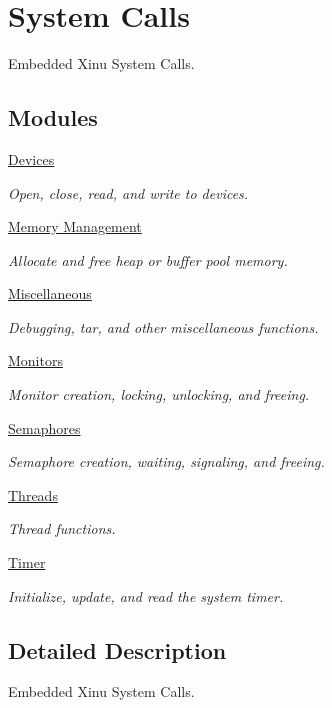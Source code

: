 \hypertarget{group__system}{\section{System Calls}
\label{group__system}
}


Embedded Xinu System Calls.  


\subsection*{Modules}
\begin{DoxyCompactItemize}
\item 
\hyperlink{group__devcalls}{Devices}
\begin{DoxyCompactList}\small\item\em Open, close, read, and write to devices. \end{DoxyCompactList}\item 
\hyperlink{group__memory__mgmt}{Memory Management}
\begin{DoxyCompactList}\small\item\em Allocate and free heap or buffer pool memory. \end{DoxyCompactList}\item 
\hyperlink{group__misc}{Miscellaneous}
\begin{DoxyCompactList}\small\item\em Debugging, tar, and other miscellaneous functions. \end{DoxyCompactList}\item 
\hyperlink{group__monitors}{Monitors}
\begin{DoxyCompactList}\small\item\em Monitor creation, locking, unlocking, and freeing. \end{DoxyCompactList}\item 
\hyperlink{group__semaphores}{Semaphores}
\begin{DoxyCompactList}\small\item\em Semaphore creation, waiting, signaling, and freeing. \end{DoxyCompactList}\item 
\hyperlink{group__threads}{Threads}
\begin{DoxyCompactList}\small\item\em Thread functions. \end{DoxyCompactList}\item 
\hyperlink{group__timer}{Timer}
\begin{DoxyCompactList}\small\item\em Initialize, update, and read the system timer. \end{DoxyCompactList}\end{DoxyCompactItemize}


\subsection{Detailed Description}
Embedded Xinu System Calls. 